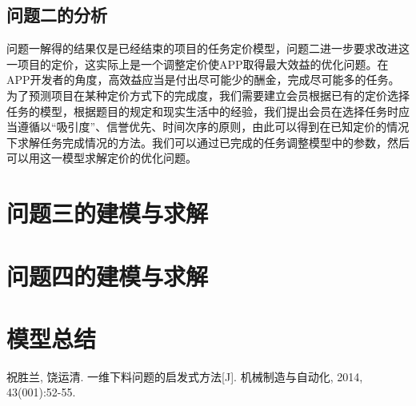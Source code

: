 \documentclass[withoutpreface,bwprint]{cumcmthesis} %
\begin{document}
\subsection{问题二的分析}
问题一解得的结果仅是已经结束的项目的任务定价模型，问题二进一步要求改进这一项目的定价，这实际上是一个调整定价使APP取得最大效益的优化问题。在APP开发者的角度，高效益应当是付出尽可能少的酬金，完成尽可能多的任务。为了预测项目在某种定价方式下的完成度，我们需要建立会员根据已有的定价选择任务的模型，根据题目的规定和现实生活中的经验，我们提出会员在选择任务时应当遵循以“吸引度”、信誉优先、时间次序的原则，由此可以得到在已知定价的情况下求解任务完成情况的方法。我们可以通过已完成的任务调整模型中的参数，然后可以用这一模型求解定价的优化问题。

\section{问题三的建模与求解}

\section{问题四的建模与求解}

\section{模型总结}

\begin{thebibliography}{9}%
    祝胜兰, 饶运清. 一维下料问题的启发式方法[J]. 机械制造与自动化, 2014, 43(001):52-55.
\end{thebibliography}

\begin{appendices}
\end{appendices}
\end{document}
